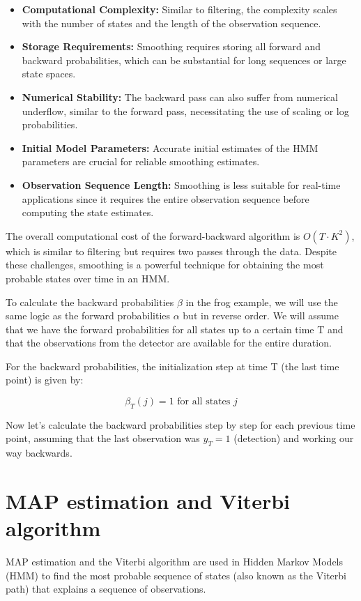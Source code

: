 \documentclass[10pt]{article}
\begin{document}
\begin{itemize}
  \item \textbf{Computational Complexity:} Similar to filtering, the complexity scales with the number of states and the length of the observation sequence.
  \item \textbf{Storage Requirements:} Smoothing requires storing all forward and backward probabilities, which can be substantial for long sequences or large state spaces.
  \item \textbf{Numerical Stability:} The backward pass can also suffer from numerical underflow, similar to the forward pass, necessitating the use of scaling or log probabilities.
  \item \textbf{Initial Model Parameters:} Accurate initial estimates of the HMM parameters are crucial for reliable smoothing estimates.
  \item \textbf{Observation Sequence Length:} Smoothing is less suitable for real-time applications since it requires the entire observation sequence before computing the state estimates.
\end{itemize}

The overall computational cost of the forward-backward algorithm is \( O(T \cdot K^2) \), which is similar to filtering but requires two passes through the data. Despite these challenges, smoothing is a powerful technique for obtaining the most probable states over time in an HMM.

To calculate the backward probabilities \(\beta\) in the frog example, we will use the same logic as the forward probabilities \(\alpha\) but in reverse order. We will assume that we have the forward probabilities for all states up to a certain time T and that the observations from the detector are available for the entire duration.

For the backward probabilities, the initialization step at time T (the last time point) is given by:

\[ \beta_T(j) = 1 \text{ for all states } j \]

Now let's calculate the backward probabilities step by step for each previous time point, assuming that the last observation was \( y_T = 1 \) (detection) and working our way backwards.
\section{MAP estimation and Viterbi algorithm}
MAP estimation and the Viterbi algorithm are used in Hidden Markov Models (HMM) to find the most probable sequence of states (also known as the Viterbi path) that explains a sequence of observations.
\end{document}
